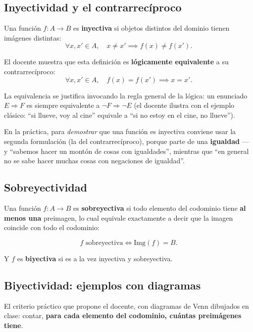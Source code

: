 \documentclass[12pt,a4paper]{article}
\begin{document}
\subsection{Inyectividad y el contrarrecíproco}

Una función $f:A\to B$ es \textbf{inyectiva} si objetos distintos del dominio tienen imágenes distintas:
$$\forall x, x' \in A,\quad x \neq x' \implies f(x) \neq f(x').$$

El docente muestra que esta definición es \textbf{lógicamente equivalente} a su contrarrecíproco:
$$\forall x, x' \in A,\quad f(x) = f(x') \implies x = x'.$$

La equivalencia se justifica invocando la regla general de la lógica: un enunciado $E \Rightarrow F$ es siempre equivalente a $\lnot F \Rightarrow \lnot E$ (el docente ilustra con el ejemplo clásico: ``si llueve, voy al cine'' equivale a ``si no estoy en el cine, no llueve'').

\begin{notebox}
En la práctica, para \emph{demostrar} que una función es inyectiva conviene usar la segunda formulación (la del contrarrecíproco), porque parte de una \textbf{igualdad} --- y ``sabemos hacer un montón de cosas con igualdades'', mientras que ``en general no se sabe hacer muchas cosas con negaciones de igualdad''.
\end{notebox}

\subsection{Sobreyectividad}

Una función $f:A\to B$ es \textbf{sobreyectiva} si todo elemento del codominio tiene \textbf{al menos una} preimagen, lo cual equivale exactamente a decir que la imagen coincide con todo el codominio:

\begin{keybox}
$$\boxed{f \text{ sobreyectiva} \iff \mathrm{Img}(f) = B.}$$
\end{keybox}

Y $f$ es \textbf{biyectiva} si es a la vez inyectiva y sobreyectiva.

\subsection{Biyectividad: ejemplos con diagramas}

El criterio práctico que propone el docente, con diagramas de Venn dibujados en clase: contar, \textbf{para cada elemento del codominio, cuántas preimágenes tiene}.
\end{document}

